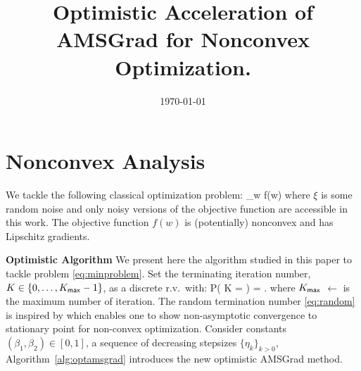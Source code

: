 \documentclass[11pt]{article}
\theoremstyle{k}
\begin{document}
\title{Optimistic Acceleration of AMSGrad for Nonconvex Optimization.}
\date{\today}

\maketitle


\section{Nonconvex Analysis}
We tackle the following classical optimization problem:
\beq\label{eq:minproblem}
\min \limits_{w \in \Theta} f(w) \eqdef \EE[ f(w, \xi)]
\eeq
where $\xi$ is some random noise and only noisy versions of the objective function are accessible in this work.
The objective function $f(w)$ is (potentially) nonconvex and has Lipschitz gradients.

\textbf{Optimistic Algorithm}
We present here the algorithm studied in this paper to tackle problem \eqref{eq:minproblem}.
Set the terminating iteration number, $K \in \{0,\dots,K_{\sf max}-1\}$, as a discrete r.v.~with:
\beq \label{eq:random}
   P( K = \ell ) = .
\eeq
where $K_{\sf max}$ $\leftarrow$ is the maximum number of iteration.
The random termination number \eqref{eq:random} is inspired by \citep{ghadimi2013stochastic} which enables one to show non-asymptotic convergence to stationary point for non-convex optimization. 
Consider constants $(\beta_1, \beta_2) \in [0,1]$, a sequence of decreasing stepsizes $\{\eta_k\}_{k>0}$, Algorithm~\ref{alg:optamsgrad} introduces the new optimistic AMSGrad method.
\end{document}
